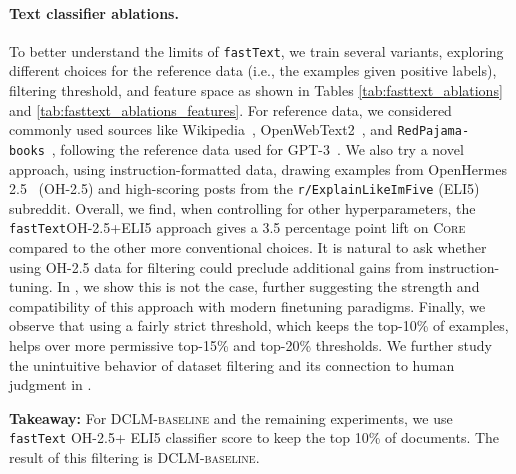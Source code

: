 \documentclass{article}
\newcommand{\takeawaybox}[1]{%
  \begin{tcolorbox}[
    colback=blue!10,
    colframe=blue!50,
    boxrule=0.5pt,
    arc=0mm,
    left=5pt,
    right=5pt,
    top=2pt,
    bottom=2pt,
    fontupper={\fontsize{9.5pt}{11.75pt}\selectfont}
  ]
    \textbf{Takeaway:} #1
  \end{tcolorbox}%
  \vspace*{-0.1cm}
}
\newcommand{\hqpool}{\textsc{DCLM-baseline}\xspace}
\newcommand{\oh}{\textsc{OH-2.5}\xspace}
\newcommand{\ltrack}{\texttt{7B-1x}\xspace}
\newcommand{\rpj}{\texttt{RedPajama}\xspace}
\newcommand{\rw}{\texttt{RefinedWeb}\xspace}
\newcommand{\fasttext}{\texttt{fastText}\xspace}
\newcommand{\lowvar}{\textsc{Core}\xspace}
\begin{document}
\paragraph{Text classifier ablations.}
To better understand the limits of \fasttext, we train several variants, exploring different choices for the reference data (i.e., the examples given positive labels), filtering threshold, and feature space as shown in Tables \ref{tab:fasttext_ablations} and \ref{tab:fasttext_ablations_features}.
For reference data, we considered commonly used sources like
Wikipedia~\citep{pile},
OpenWebText2~\citep{pile},
and \rpj{}\texttt{-books}~\citep{rpj},
following the reference data used for GPT-3~\citep{gpt3}.
We also try a novel approach, using instruction-formatted data, drawing examples from OpenHermes 2.5~\citep{openhermes} (\oh)
and high-scoring posts from the \texttt{r/ExplainLikeImFive} (ELI5) subreddit.
Overall, we find, when controlling for other hyperparameters, the \fasttext \oh+ELI5 approach gives a 3.5 percentage point lift on \lowvar compared to the other more conventional choices.
It is natural to ask whether using \oh data for filtering could preclude additional gains from instruction-tuning.
In , we show this is not the case, further suggesting the strength and compatibility of this approach with modern finetuning paradigms.
Finally, we observe that using a fairly strict threshold, which keeps the top-10\% of examples, helps over more permissive top-15\% and top-20\% thresholds. We further study the unintuitive behavior of dataset filtering and its connection to human judgment in .
\label{subsec:ablations}
\begin{table}[ht]
\centering
\caption{\textbf{\fasttext ablations} (\ltrack{} scale). We ablate choices for the positive data (top) and threshold (bottom).
`Dataset' is the positive set, while the negatives are randomly sampled our \rw reproduction.
`Threshold' is the percentile used for filtering based on \fasttext scores.
``GPT-3 Approx'' refers to a mix of Wikipedia, OpenWebText2, and RPJ Books, as in \citep{gpt3}.}
\label{tab:fasttext_ablations}

\end{table}

\takeawaybox{For \hqpool{} and the remaining experiments, we use \fasttext{} \oh + ELI5 classifier score to keep the top 10\% of documents. The result of this filtering is \hqpool{}.}
\end{document}
